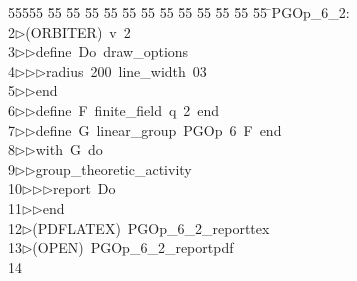 %
%
\begin{tabbing}
55555 \= 55 \= 55 \= 55 \= 55 \= 55 \= 55 \= 55 \= 55 \= 55 \= 55 \= 55 \= 55 \= \>PGOp\_6\_2:\\[0pt]
2\>$\triangleright$\>(ORBITER)\ v\ 2\ \\[0pt]
3\>$\triangleright$\>$\triangleright$\>define\ Do\ draw\_options\ \\[0pt]
4\>$\triangleright$\>$\triangleright$\>$\triangleright$\>radius\ 200\ line\_width\ 03\ \\[0pt]
5\>$\triangleright$\>$\triangleright$\>end\ \\[0pt]
6\>$\triangleright$\>$\triangleright$\>define\ F\ finite\_field\ q\ 2\ end\ \\[0pt]
7\>$\triangleright$\>$\triangleright$\>define\ G\ linear\_group\ PGOp\ 6\ F\ end\ \\[0pt]
8\>$\triangleright$\>$\triangleright$\>with\ G\ do\ \\[0pt]
9\>$\triangleright$\>$\triangleright$\>group\_theoretic\_activity\ \\[0pt]
10\>$\triangleright$\>$\triangleright$\>$\triangleright$\>report\ Do\ \\[0pt]
11\>$\triangleright$\>$\triangleright$\>end\\[0pt]
12\>$\triangleright$\>(PDFLATEX)\ PGOp\_6\_2\_reporttex\\[0pt]
13\>$\triangleright$\>(OPEN)\ PGOp\_6\_2\_reportpdf\\[0pt]
14\>\end{tabbing}
